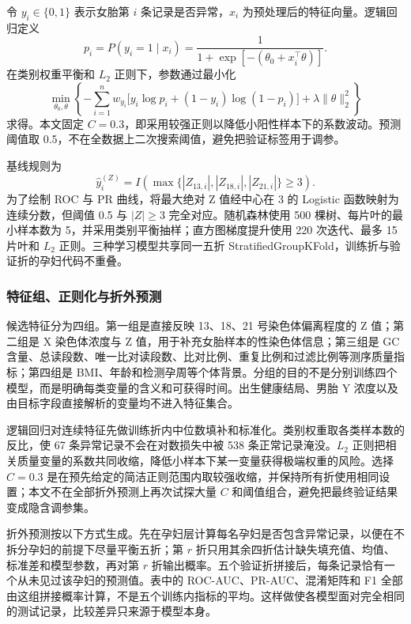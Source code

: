 \documentclass[UTF8,a4paper,12pt]{ctexart}
\begin{document}
令 $y_i\in\{0,1\}$ 表示女胎第 $i$ 条记录是否异常，$x_i$ 为预处理后的特征向量。逻辑回归定义
\begin{equation}
p_i=P(y_i=1\mid x_i)=\frac{1}{1+\exp[-(\theta_0+x_i^\top\theta)]}.
\label{eq:logistic}
\end{equation}
在类别权重平衡和 $L_2$ 正则下，参数通过最小化
\begin{equation}
\min_{\theta_0,\theta}\left\{-\sum_{i=1}^{n}w_{y_i}\big[y_i\log p_i+(1-y_i)\log(1-p_i)\big]+\lambda\|\theta\|_2^2\right\}
\label{eq:logloss}
\end{equation}
求得。本文固定 $C=0.3$，即采用较强正则以降低小阳性样本下的系数波动。预测阈值取 0.5，不在全数据上二次搜索阈值，避免把验证标签用于调参。

基线规则为
\begin{equation}
\widehat y_i^{(Z)}=I\!\left(\max\{|Z_{13,i}|,|Z_{18,i}|,|Z_{21,i}|\}\ge3\right).
\label{eq:zrule}
\end{equation}
为了绘制 ROC 与 PR 曲线，将最大绝对 Z 值经中心在 3 的 Logistic 函数映射为连续分数，但阈值 0.5 与 $|Z|\ge3$ 完全对应。随机森林使用 500 棵树、每片叶的最小样本数为 5，并采用类别平衡抽样；直方图梯度提升使用 220 次迭代、最多 15 片叶和 $L_2$ 正则。三种学习模型共享同一五折 StratifiedGroupKFold，训练折与验证折的孕妇代码不重叠。

\subsubsection{特征组、正则化与折外预测}

候选特征分为四组。第一组是直接反映 13、18、21 号染色体偏离程度的 Z 值；第二组是 X 染色体浓度与 Z 值，用于补充女胎样本的性染色体信息；第三组是 GC 含量、总读段数、唯一比对读段数、比对比例、重复比例和过滤比例等测序质量指标；第四组是 BMI、年龄和检测孕周等个体背景。分组的目的不是分别训练四个模型，而是明确每类变量的含义和可获得时间。出生健康结局、男胎 Y 浓度以及由目标字段直接解析的变量均不进入特征集合。

逻辑回归对连续特征先做训练折内中位数填补和标准化。类别权重取各类样本数的反比，使 67 条异常记录不会在对数损失中被 538 条正常记录淹没。$L_2$ 正则把相关质量变量的系数共同收缩，降低小样本下某一变量获得极端权重的风险。选择 $C=0.3$ 是在预先给定的简洁正则范围内取较强收缩，并保持所有折使用相同设置；本文不在全部折外预测上再次试探大量 $C$ 和阈值组合，避免把最终验证结果变成隐含调参集。

折外预测按以下方式生成。先在孕妇层计算每名孕妇是否包含异常记录，以便在不拆分孕妇的前提下尽量平衡五折；第 $r$ 折只用其余四折估计缺失填充值、均值、标准差和模型参数，再对第 $r$ 折输出概率。五个验证折拼接后，每条记录恰有一个从未见过该孕妇的预测值。表中的 ROC-AUC、PR-AUC、混淆矩阵和 F1 全部由这组拼接概率计算，不是五个训练内指标的平均。这样做使各模型面对完全相同的测试记录，比较差异只来源于模型本身。
\end{document}
